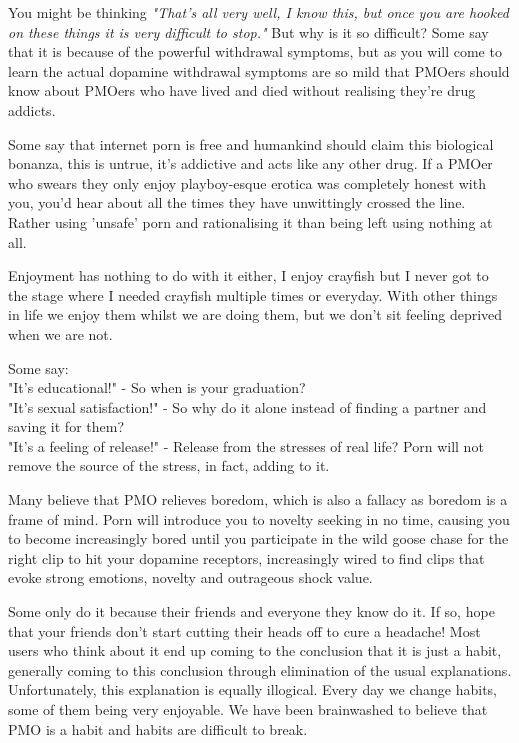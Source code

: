 \documentclass[easypeasy.tex]{subfiles}
\begin{document}
You might be thinking \textit{"That's all very well, I know this, but once you are hooked on these things it is very difficult to stop."} But why is it so difficult? Some say that it is because of the powerful withdrawal symptoms, but as you will come to learn the actual dopamine withdrawal symptoms are so mild that PMOers should know about PMOers who have lived and died without realising they're drug addicts.

Some say that internet porn is free and humankind should claim this biological bonanza, this is untrue, it's addictive and acts like any other drug. If a PMOer who swears they only enjoy playboy-esque erotica was completely honest with you, you'd hear about all the times they have unwittingly crossed the line. Rather using 'unsafe' porn and rationalising it than being left using nothing at all.

Enjoyment has nothing to do with it either, I enjoy crayfish but I never got to the stage where I needed crayfish multiple times or everyday. With other things in life we enjoy them whilst we are doing them, but we don't sit feeling deprived when we are not.

Some say:\\
  "It's educational!" - So when is your graduation?\\
  "It's sexual satisfaction!" - So why do it alone instead of finding a partner and saving it for them?\\
  "It's a feeling of release!" - Release from the stresses of real life? Porn will not remove the source of the stress, in fact, adding to it.

Many believe that PMO relieves boredom, which is also a fallacy as boredom is a frame of mind. Porn will introduce you to novelty seeking in no time, causing you to become increasingly bored until you participate in the wild goose chase for the right clip to hit your dopamine receptors, increasingly wired to find clips that evoke strong emotions, novelty and outrageous shock value.

Some only do it because their friends and everyone they know do it. If so, hope that your friends don't start cutting their heads off to cure a headache! Most users who think about it end up coming to the conclusion that it is just a habit, generally coming to this conclusion through elimination of the usual explanations. Unfortunately, this explanation is equally illogical. Every day we change habits, some of them being very enjoyable. We have been brainwashed to believe that PMO is a habit and habits are difficult to break.
\end{document}

